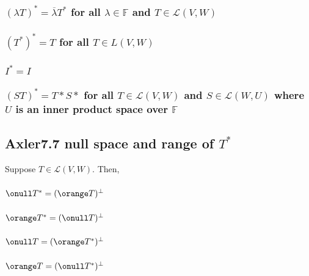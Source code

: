 \documentclass[letterpaper]{article}
\begin{document}
\subsubsection{\((\lambda T)^* = \overline{\lambda}  T^*\) for all \(\lambda \in  \mathbb{F}\) and \(T \in  \mathcal{L} (V, W)\)}
\label{sec:org399d7e6}

\subsubsection{\((T^*)^* = T\) for all \(T \in  L(V, W)\)}
\label{sec:org9d000ee}

\subsubsection{\(I^* = I\)}
\label{sec:org76f0a67}

\subsubsection{\((ST)^* = T*S*\) for all \(T \in \mathcal{L} (V, W)\) and \(S \in  \mathcal{L} (W, U)\) where \(U\) is an inner product space over \(\mathbb{F}\)}
\label{sec:org9315f54}

\subsection{Axler7.7 null space and range of \(T^*\)}
\label{sec:orgf1cf10d}

Suppose \(T \in  \mathcal{L}(V, W)\). Then,

\subsubsection{\(\onull T^* = (\orange T)^\bot\)}
\label{sec:org48353da}

\subsubsection{\(\orange T^* = (\onull T)^\bot\)}
\label{sec:org3f1a838}

\subsubsection{\(\onull T = (\orange T^*)^\bot\)}
\label{sec:org2cfde47}

\subsubsection{\(\orange T = (\onull T^*)^\bot\)}
\label{sec:org0c6ded3}
\end{document}
